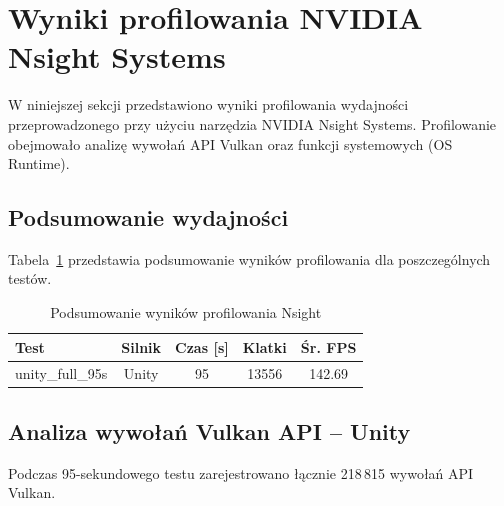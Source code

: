 
\section{Wyniki profilowania NVIDIA Nsight Systems}
\label{sec:wyniki-nsight}

W niniejszej sekcji przedstawiono wyniki profilowania wydajności
przeprowadzonego przy użyciu narzędzia NVIDIA Nsight Systems.
Profilowanie obejmowało analizę wywołań API Vulkan oraz funkcji
systemowych (OS Runtime).

\subsection{Podsumowanie wydajności}
\label{subsec:nsight-podsumowanie}

Tabela~\ref{tab:nsight-summary} przedstawia podsumowanie
wyników profilowania dla poszczególnych testów.

\begin{table}[htbp]
\centering
\caption{Podsumowanie wyników profilowania Nsight}
\label{tab:nsight-summary}
\begin{tabular}{|l|c|c|c|c|}
\hline
\textbf{Test} & \textbf{Silnik} & \textbf{Czas [s]} & \textbf{Klatki} & \textbf{Śr. FPS} \\
\hline
unity\_full\_95s & Unity & 95 & 13556 & 142.69 \\
\hline
\end{tabular}
\end{table}

\subsection{Analiza wywołań Vulkan API -- Unity}
\label{subsec:vulkan-unity-full-95s}

Podczas 95-sekundowego testu zarejestrowano
łącznie 218\,815 wywołań API Vulkan.

